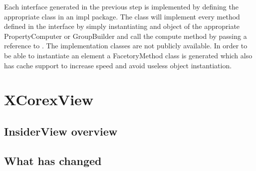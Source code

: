 	Each interface generated in the previous step is implemented by defining the
appropriate class in an impl package. The class will implement every method
defined in the interface by simply instantiating and object of the appropriate
PropertyComputer or GroupBuilder and call the compute method by passing a
reference to . The implementation classes are not publicly available.
In order to be able to instantiate an element a FacetoryMethod class is
generated which also has cache support to increase speed and avoid useless
object instantiation.
	
\begin{figure}
\centering
{}
\label{fig:xCorexError}
\end{figure}

\section {XCorexView}

\subsection {InsiderView overview}

\subsection {What has changed}

	